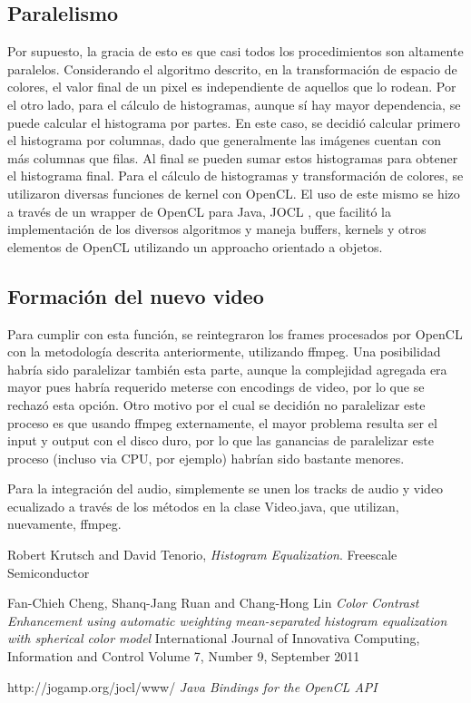 \documentclass[12pt,spanish]{article}
\begin{document}
	\subsection{Paralelismo}
	Por supuesto, la gracia de esto es que casi todos los procedimientos son altamente paralelos. Considerando el algoritmo descrito, en la transformaci\'on de espacio de colores, el valor final de un pixel es independiente de aquellos que lo rodean.
	Por el otro lado, para el c\'alculo de histogramas, aunque s\'i hay mayor dependencia, se puede calcular el histograma por partes. En este caso, se decidi\'o calcular primero el histograma por columnas, dado que generalmente las im\'agenes cuentan con m\'as columnas que filas. Al final se pueden sumar estos histogramas para obtener el histograma final.
	Para el c\'alculo de histogramas y transformaci\'on de colores, se utilizaron diversas funciones de kernel con OpenCL. El uso de este mismo se hizo a trav\'es de un wrapper de OpenCL para Java, JOCL \cite{JOCL}, que facilit\'o la implementaci\'on de los diversos algoritmos y maneja buffers, kernels y otros elementos de OpenCL utilizando un approacho orientado a objetos.	

	\subsection{Formaci\'on del nuevo video}
	Para cumplir con esta funci\'on, se reintegraron los frames procesados por OpenCL con la metodolog\'ia descrita anteriormente, utilizando ffmpeg. Una posibilidad habr\'ia sido paralelizar tambi\'en esta parte, aunque la complejidad agregada era mayor pues habr\'ia requerido meterse con encodings de video, por lo que se rechaz\'o esta opci\'on. Otro motivo por el cual se decidi\'on no paralelizar este proceso es que usando ffmpeg externamente, el mayor problema resulta ser el input y output con el disco duro, por lo que las ganancias de paralelizar este proceso (incluso via CPU, por ejemplo) habr\'ian sido bastante menores.

	Para la integraci\'on del audio, simplemente se unen los tracks de audio y video ecualizado a trav\'es de los m\'etodos en la clase Video.java, que utilizan, nuevamente, ffmpeg.

\begin{thebibliography}{9}

  Robert Krutsch and David Tenorio,
  \emph{Histogram Equalization}.
  Freescale Semiconductor

  Fan-Chieh Cheng, Shanq-Jang Ruan and Chang-Hong Lin
  \emph{Color Contrast Enhancement using automatic weighting mean-separated histogram equalization with spherical color model}
  International Journal of Innovativa Computing, Information and Control
  Volume 7, Number 9, September 2011

  http://jogamp.org/jocl/www/
  \emph{Java Bindings for the OpenCL API}
  

\end{thebibliography}
\end{document}
